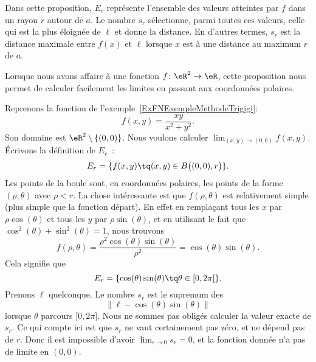 Dans cette proposition, $E_r$ représente l'ensemble des valeurs atteintes par $f$ dans un rayon $r$ autour de $a$. Le nombre $s_r$ sélectionne, parmi toutes ces valeurs, celle qui est la plus éloignée de $\ell$ et donne la distance. En d'autres termes, $s_r$ est la distance maximale entre $f(x)$ et $\ell$ lorsque $x$ est à une distance au maximum $r$ de $a$.

Lorsque nous avons affaire à une fonction $f\colon \eR^2\to \eR$, cette proposition nous permet de calculer facilement les limites en passant aux coordonnées polaires.

\begin{example}		\label{ExempleMethodeTrigigi}
	Reprenons la fonction de l'exemple~\ref{ExFNExempleMethodeTrigigi}:
	\begin{equation}
		f(x,y)=\frac{ xy }{ x^2+y^2 }.
	\end{equation}
	Son domaine est $\eR^2\setminus\{ (0,0) \}$. Nous voulons calculer $\lim_{(x,y)\to(0,0)}f(x,y)$. Écrivons la définition de $E_r$~:
	\begin{equation}
		E_r=\{ f(x,y)\tq (x,y)\in B\big( (0,0),r \big) \}.
	\end{equation}
	Les points de la boule sont, en coordonnées polaires, les points de la forme $(\rho,\theta)$ avec $\rho<r$. La chose intéressante est que $f(\rho,\theta)$ est relativement simple (plus simple que la fonction départ). En effet en remplaçant tous les $x$ par $\rho\cos(\theta)$ et tous les $y$ par $\rho\sin(\theta)$, et en utilisant le fait que $\cos^2(\theta)+\sin^2(\theta)=1$, nous trouvons
	\begin{equation}		\label{Eq2807fpolairerhodeuxcossin}
		f(\rho,\theta)=\frac{ \rho^2\cos(\theta)\sin(\theta) }{ \rho^2 }=\cos(\theta)\sin(\theta).
	\end{equation}
	Cela signifie que
	\begin{equation}
		E_r=\{ \cos(\theta)\sin(\theta)\tq\theta\in\mathopen[ 0 , 2\pi [ \}.
	\end{equation}
	Prenons $\ell$ quelconque. Le nombre $s_r$ est le supremum des
	\begin{equation}
		\| \ell-\cos(\theta)\sin(\theta) \|
	\end{equation}
	lorsque $\theta$ parcours $\mathopen[ 0 , 2\pi \mathclose]$. Nous ne sommes pas obligés calculer la valeur exacte de $s_r$. Ce qui compte ici est que $s_r$ ne vaut certainement pas zéro, et ne dépend pas de $r$. Donc il est impossible d'avoir $\lim_{r\to 0} s_r=0$, et la fonction donnée n'a pas de limite en $(0,0)$.
\end{example}

